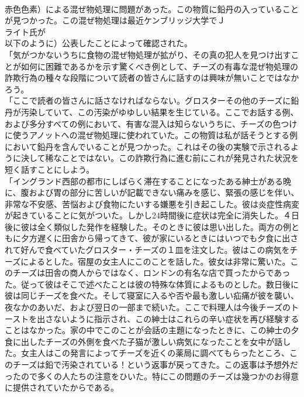 \documentclass[8pt]{extreport}
\begin{document}
\begin{CJK}{UTF8}{min}
\\	赤色色素）による混ぜ物処理に問題があった。この物質に鉛丹の入っていることが見つかった。この混ぜ物処理は最近ケンブリッジ大学でＪ
\\	ライト氏が
\\	以下のように）公表したことによって確認された。
\\	「気がつかないうちに食物の混ぜ物処理が拡がり、その真の犯人を見つけ出すことが如何に困難であるかを示す驚くべき例として、チーズの有毒な混ぜ物処理の詐欺行為の種々な段階について読者の皆さんに話すのは興味が無いことではなかろう。
\\	「ここで読者の皆さんに話さなければならない。グロスターその他のチーズに鉛丹が汚染していて、この汚染がゆゆしい結果を生じている。ここでお話する例、および多分すべての例において、有害な混入は知らないうちに、チーズの色つけに使うアノットへの混ぜ物処理に使われていた。この物質は私が話そうとする例において鉛丹を含んでいることが見つかった。これはその後の実験で示されるように決して稀なことではない。この詐欺行為に進む前にこれが発見された状況を短く話すことにしよう。
\\	「イングランド西部の都市にしばらく滞在することになったある紳士がある晩に、腹および胃の部分に苦しいが記載できない痛みを感じ、緊張の感じを伴い、非常な不安感、苦悩および食物にたいする嫌悪を引き起こした。彼は炎症性病変が起きていることに気がついた。しかし24時間後に症状は完全に消失した。４日後に彼は全く類似した発作を経験した。そのときに彼は思い出した。両方の例ともに夕方遅くに田舎から帰ってきて、彼が家にいるときにはいつでも夕食に出されて好んで食べていたグロスター・チーズの１皿を注文した。彼はこの病気をチーズによるとした。宿屋の女主人にこのことを話した。彼女は非常に驚いた。このチーズは田舎の商人からではなく、ロンドンの有名な店で買ったからであった。従って彼はそこで述べたことは彼の特殊な体質によるものとした。数日後に彼は同じチーズを食べた。そして寝室に入るや否や最も激しい疝痛が彼を襲い、夜なかのあいだ、および翌日の一部まで続いた。ここで料理人は今後チーズのトーストを出さないように指示され、この紳士はこれらの辛い症状を再び経験することはなかった。家の中でこのことが会話の主題になったときに、この紳士の夕食に出したチーズの外側を食べた子猫が激しい病気になったことを女中が話した。女主人はこの発言によってチーズを近くの薬局に調べてもらったところ、このチーズは鉛で汚染されている！という返事が戻ってきた。この返事は予想外だったので多くの人たちの注意をひいた。特にこの問題のチーズは幾つかのお得意に提供されていたからである。

\end{CJK}
\end{document}
